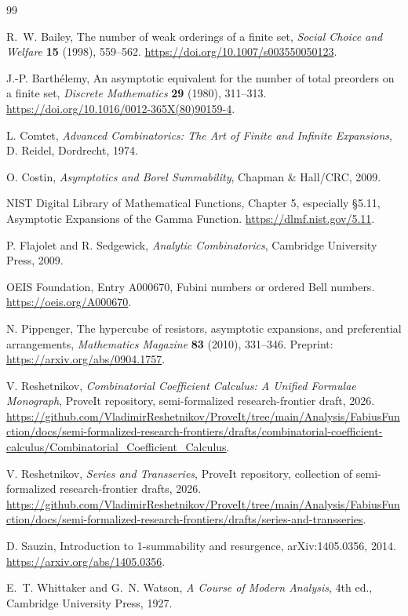 \documentclass[11pt,a4paper]{article}
\theoremstyle{definition}
\theoremstyle{remark}
\begin{document}
\begin{thebibliography}{99}

R.~W. Bailey,
\newblock The number of weak orderings of a finite set,
\newblock \emph{Social Choice and Welfare} \textbf{15} (1998), 559--562.
\newblock \url{https://doi.org/10.1007/s003550050123}.

J.-P. Barth\'elemy,
\newblock An asymptotic equivalent for the number of total preorders on a finite set,
\newblock \emph{Discrete Mathematics} \textbf{29} (1980), 311--313.
\newblock \url{https://doi.org/10.1016/0012-365X(80)90159-4}.

L. Comtet,
\newblock \emph{Advanced Combinatorics: The Art of Finite and Infinite Expansions},
\newblock D. Reidel, Dordrecht, 1974.

O. Costin,
\newblock \emph{Asymptotics and Borel Summability},
\newblock Chapman \& Hall/CRC, 2009.

NIST Digital Library of Mathematical Functions,
\newblock Chapter 5, especially \S5.11, Asymptotic Expansions of the Gamma Function.
\newblock \url{https://dlmf.nist.gov/5.11}.

P. Flajolet and R. Sedgewick,
\newblock \emph{Analytic Combinatorics},
\newblock Cambridge University Press, 2009.

OEIS Foundation,
\newblock Entry A000670, Fubini numbers or ordered Bell numbers.
\newblock \url{https://oeis.org/A000670}.

N. Pippenger,
\newblock The hypercube of resistors, asymptotic expansions, and preferential arrangements,
\newblock \emph{Mathematics Magazine} \textbf{83} (2010), 331--346.
\newblock Preprint: \url{https://arxiv.org/abs/0904.1757}.

V. Reshetnikov,
\newblock \emph{Combinatorial Coefficient Calculus: A Unified Formulae Monograph},
\newblock ProveIt repository, semi-formalized research-frontier draft, 2026.
\newblock \url{https://github.com/VladimirReshetnikov/ProveIt/tree/main/Analysis/FabiusFunction/docs/semi-formalized-research-frontiers/drafts/combinatorial-coefficient-calculus/Combinatorial_Coefficient_Calculus}.

V. Reshetnikov,
\newblock \emph{Series and Transseries},
\newblock ProveIt repository, collection of semi-formalized research-frontier drafts, 2026.
\newblock \url{https://github.com/VladimirReshetnikov/ProveIt/tree/main/Analysis/FabiusFunction/docs/semi-formalized-research-frontiers/drafts/series-and-transseries}.

D. Sauzin,
\newblock Introduction to 1-summability and resurgence,
\newblock arXiv:1405.0356, 2014.
\newblock \url{https://arxiv.org/abs/1405.0356}.

E.~T. Whittaker and G.~N. Watson,
\newblock \emph{A Course of Modern Analysis}, 4th ed.,
\newblock Cambridge University Press, 1927.

\end{thebibliography}
\end{document}
